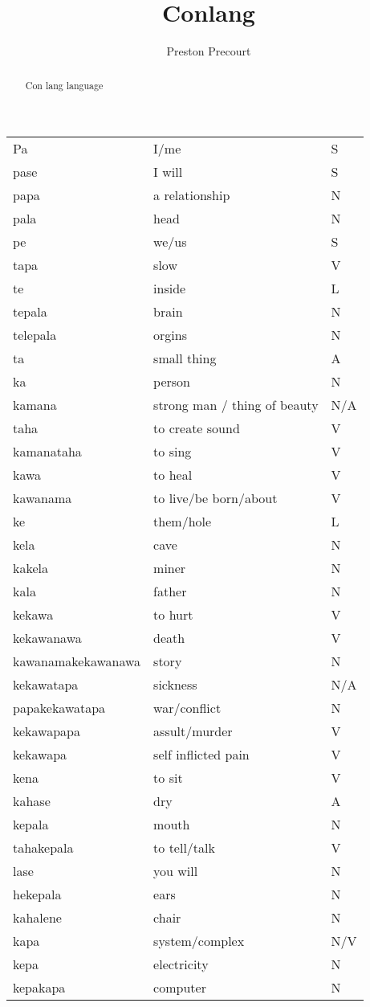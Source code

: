 \documentclass{article}
\title{Conlang}
\author{Preston Precourt}
\begin{document}
\maketitle

\begin{abstract}
Con lang language
\end{abstract}
\begin{tabular}{|l|l|l|}
Pa&I/me&S\\
pase&I will&S\\
papa&a relationship&N\\
pala&head&N\\
pe&we/us&S\\
tapa&slow&V\\
te&inside&L\\
tepala&brain&N\\
telepala&orgins&N\\
ta&small thing&A\\
ka&person&N\\
kamana&strong man / thing of beauty&N/A\\
taha&to create sound&V\\
kamanataha&to sing&V\\
kawa&to heal&V\\
kawanama&to live/be born/about&V\\
ke&them/hole&L\\
kela&cave&N\\
kakela&miner&N\\
kala&father&N\\
kekawa&to hurt&V\\
kekawanawa&death&V\\
kawanamakekawanawa&story&N\\
kekawatapa&sickness&N/A\\
papakekawatapa&war/conflict&N\\
kekawapapa&assult/murder&V\\
kekawapa&self inflicted pain&V\\
kena&to sit&V\\
kahase&dry&A\\
kepala&mouth&N\\
tahakepala&to tell/talk&V\\
lase&you will&N\\
hekepala&ears&N\\
kahalene&chair&N\\
kapa&system/complex&N/V\\
kepa&electricity&N\\
kepakapa&computer&N\\

\end{tabular}
\end{document}
